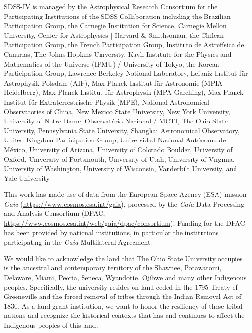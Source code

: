 \documentclass[twocolumn,twocolappendix,linenumbers]{aastex631}
\begin{document}
SDSS-IV is managed by the 
Astrophysical Research Consortium 
for the Participating Institutions 
of the SDSS Collaboration including 
the Brazilian Participation Group, 
the Carnegie Institution for Science, 
Carnegie Mellon University, Center for 
Astrophysics | Harvard \& 
Smithsonian, the Chilean Participation 
Group, the French Participation Group, 
Instituto de Astrof\'isica de 
Canarias, The Johns Hopkins 
University, Kavli Institute for the 
Physics and Mathematics of the 
Universe (IPMU) / University of 
Tokyo, the Korean Participation Group, 
Lawrence Berkeley National Laboratory, 
Leibniz Institut f\"ur Astrophysik 
Potsdam (AIP),  Max-Planck-Institut 
f\"ur Astronomie (MPIA Heidelberg), 
Max-Planck-Institut f\"ur 
Astrophysik (MPA Garching), 
Max-Planck-Institut f\"ur 
Extraterrestrische Physik (MPE), 
National Astronomical Observatories of 
China, New Mexico State University, 
New York University, University of 
Notre Dame, Observat\'ario 
Nacional / MCTI, The Ohio State 
University, Pennsylvania State 
University, Shanghai 
Astronomical Observatory, United 
Kingdom Participation Group, 
Universidad Nacional Aut\'onoma 
de M\'exico, University of Arizona, 
University of Colorado Boulder, 
University of Oxford, University of 
Portsmouth, University of Utah, 
University of Virginia, University 
of Washington, University of 
Wisconsin, Vanderbilt University, 
and Yale University.

This work has made use of data from the European Space Agency (ESA) mission
{\it Gaia} (\url{https://www.cosmos.esa.int/gaia}), processed by the {\it Gaia}
Data Processing and Analysis Consortium (DPAC,
\url{https://www.cosmos.esa.int/web/gaia/dpac/consortium}). Funding for the DPAC
has been provided by national institutions, in particular the institutions
participating in the {\it Gaia} Multilateral Agreement.

We would like to acknowledge the land that The Ohio State University occupies is the ancestral and contemporary territory of the Shawnee, Potawatomi, Delaware, Miami, Peoria, Seneca, Wyandotte, Ojibwe and many other Indigenous peoples. Specifically, the university resides on land ceded in the 1795 Treaty of Greeneville and the forced removal of tribes through the Indian Removal Act of 1830. As a land grant institution, we want to honor the resiliency of these tribal nations and recognize the historical contexts that has and continues to affect the Indigenous peoples of this land.
\end{document}
